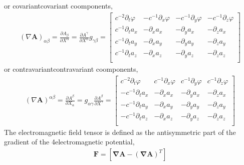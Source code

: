 \documentclass[letterpaper,10pt,english]{jupyterBook}
\begin{document}
\sphinxAtStartPar
or covariant\sphinxhyphen{}covariant coomponents,
\begin{equation*}
\begin{split}(\nabla \mathbf{A})_{\alpha \beta} = \frac{\partial A_{\beta}}{\partial X^{\alpha}} =\frac{\partial A^{\gamma}}{\partial X^{\alpha}} g_{\gamma \beta}  = 
\begin{bmatrix}
  c^{-2}\partial_t \varphi &-c^{-1}\partial_x \varphi &-c^{-1}\partial_y \varphi &-c^{-1}\partial_z \varphi \\
  c^{-1}\partial_t a_x     &      -\partial_x a_x     &      -\partial_y a_x     &      -\partial_z a_x     \\
  c^{-1}\partial_t a_y     &      -\partial_x a_y     &      -\partial_y a_y     &      -\partial_z a_y     \\
  c^{-1}\partial_t a_z     &      -\partial_x a_z     &      -\partial_y a_z     &      -\partial_z a_z     \\
\end{bmatrix}\end{split}
\end{equation*}
\sphinxAtStartPar
or contravariant\sphinxhyphen{}contravariant coomponents,
\begin{equation*}
\begin{split}(\nabla \mathbf{A})^{\alpha \beta} = \frac{\partial A^{\beta}}{\partial X_{\alpha}} = g_{\alpha \gamma} \frac{\partial A^{\beta}}{\partial X^{\gamma}} = 
\begin{bmatrix}
  c^{-2}\partial_t \varphi & c^{-1}\partial_x \varphi & c^{-1}\partial_y \varphi & c^{-1}\partial_z \varphi \\
 -c^{-1}\partial_t a_x     &      -\partial_x a_x     &      -\partial_y a_x     &      -\partial_z a_x     \\
 -c^{-1}\partial_t a_y     &      -\partial_x a_y     &      -\partial_y a_y     &      -\partial_z a_y     \\
 -c^{-1}\partial_t a_z     &      -\partial_x a_z     &      -\partial_y a_z     &      -\partial_z a_z     \\
\end{bmatrix}\end{split}
\end{equation*}
\sphinxAtStartPar
The electromagnetic field tensor is defined as the anti\sphinxhyphen{}symmetric part of the gradient of the 4\sphinxhyphen{}electromagnetic potential,
\begin{equation}\label{equation:ch/relativity-special/notes:eq:tensor:em-field}
\begin{split}\mathbf{F} = \left[ \symbf{\nabla} \mathbf{A} - \left( \symbf{\nabla} \mathbf{A} \right)^T \right]\end{split}
\end{equation}
\end{document}
